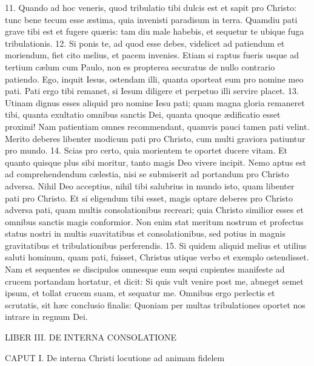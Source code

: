 11. Quando ad hoc veneris, quod tribulatio tibi dulcis est et sapit pro Christo: tunc bene tecum esse æstima, quia invenisti paradisum in terra. Quamdiu pati grave tibi est et fugere quæris: tam diu male habebis, et sequetur te ubique fuga tribulationis.
12. Si ponis te, ad quod esse debes, videlicet ad patiendum et moriendum, fiet cito melius, et pacem invenies. Etiam si raptus fueris usque ad tertium cælum cum Paulo, non es propterea securatus de nullo contrario patiendo. Ego, inquit Iesus, ostendam illi, quanta oporteat eum pro nomine meo pati. Pati ergo tibi remanet, si Iesum diligere et perpetuo illi servire placet.
13. Utinam dignus esses aliquid pro nomine Iesu pati; quam magna gloria remaneret tibi, quanta exultatio omnibus sanctis Dei, quanta quoque ædificatio esset proximi! Nam patientiam omnes recommendant, quamvis pauci tamen pati velint. Merito deberes libenter modicum pati pro Christo, cum multi graviora patiuntur pro mundo.
14. Scias pro certo, quia morientem te oportet ducere vitam. Et quanto quisque plus sibi moritur, tanto magis Deo vivere incipit. Nemo aptus est ad comprehendendum cælestia, nisi se submiserit ad portandum pro Christo adversa. Nihil Deo acceptius, nihil tibi salubrius in mundo isto, quam libenter pati pro Christo. Et si eligendum tibi esset, magis optare deberes pro Christo adversa pati, quam multis consolationibus recreari; quia Christo similior esses et omnibus sanctis magis conformior. Non enim stat meritum nostrum et profectus status nostri in multis suavitatibus et consolationibus, sed potius in magnis gravitatibus et tribulationibus perferendis.
15. Si quidem aliquid melius et utilius saluti hominum, quam pati, fuisset, Christus utique verbo et exemplo ostendisset. Nam et sequentes se discipulos omnesque eum sequi cupientes manifeste ad crucem portandam hortatur, et dicit: Si quis vult venire post me, abneget semet ipsum, et tollat crucem suam, et sequatur me. Omnibus ergo perlectis et scrutatis, sit hæc conclusio finalis: Quoniam per multas tribulationes oportet nos intrare in regnum Dei.




LIBER III.
DE INTERNA CONSOLATIONE


CAPUT I.
De interna Christi locutione ad animam fidelem

